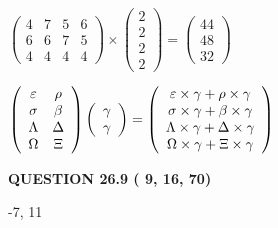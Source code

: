 \documentclass[12pt]{article}
\begin{document}
 
$\left( \begin{array}{ccccccccccccccc}
           4 & 
           7 & 
           5 & 
           6 \\ 
           6 & 
           6 & 
           7 & 
           5 \\ 
           4 & 
           4 & 
           4 & 
           4
\end{array}\right) \times
\left( \begin{array}{c}
           2 \\ 
           2 \\ 
           2 \\ 
           2
\end{array}\right)  =
\left( \begin{array}{c}
          44 \\ 
          48 \\ 
          32
\end{array}\right)  $
 
$  %
 \left( \begin{array}
 {
 c
 c
 }
 \varepsilon & 
 \rho \\ 
 \sigma & 
 \beta \\ 
 \Lambda & 
 \Delta \\ 
 \Omega & 
                    \Xi
 \end{array} \right)
 \left( \begin{array}
 {
 c
 }
 \gamma \\ 
 \gamma
 \end{array} \right)
=
  \left( \begin{array}
 {
 c
 }
 \varepsilon \times  \gamma   +  \rho \times  \gamma \\ 
 \sigma \times  \gamma   +  \beta \times  \gamma \\ 
 \Lambda \times  \gamma   +  \Delta \times  \gamma \\ 
 \Omega \times  \gamma   +                     \Xi \times  \gamma
 \end{array} \right)
$
 
 
 
  
\vspace{0.2in}
  
{\textbf{\Large{QUESTION
26.9 
 (          9,         16,         70)
}}}
  
  


 
 
\noindent{}

-7,  %
11
 
\end{document}
